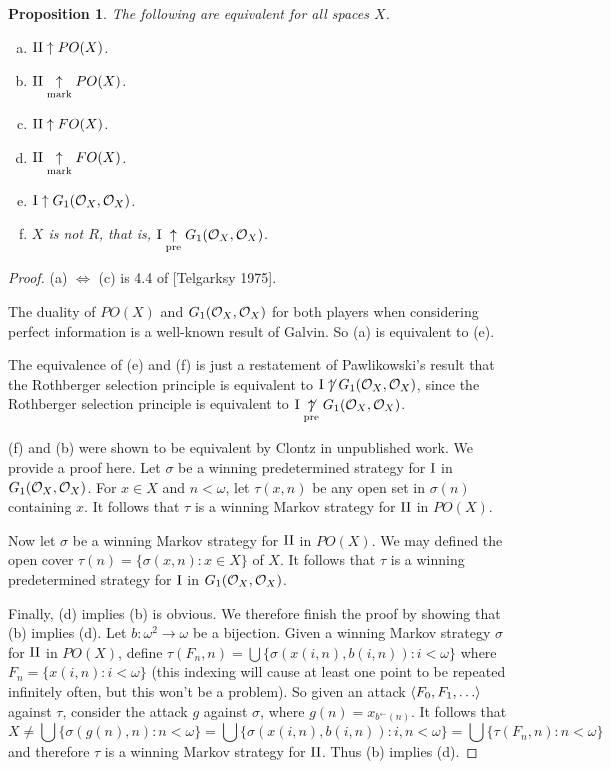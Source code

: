 \documentclass{amsart}
\theoremstyle{plain}
\newtheorem{proposition}[theorem]{Proposition}
\theoremstyle{definition}
\theoremstyle{remark}
\theoremstyle{plain}
\theoremstyle{definition}
\theoremstyle{remark}
\begin{document}
\begin{proposition}
 The following are equivalent for all spaces \(X\).
 \begin{enumerate}[a)]
  \item \(\mathrm{II}\uparrow PO(X)\).
  \item \(\mathrm{II}\underset{\text{mark}}{\uparrow} PO(X)\).
  \item \(\mathrm{II}\uparrow FO(X)\).
  \item \(\mathrm{II}\underset{\text{mark}}{\uparrow} FO(X)\).
  \item \(\mathrm{I}\uparrow G_1(\mathcal{O}_{X},\mathcal{O}_{X})\).
  \item \(X\) is not \(R\), that is, \(\mathrm{I}\underset{\text{pre}}{\uparrow} G_1(\mathcal{O}_{X},\mathcal{O}_{X})\).
 \end{enumerate}
\end{proposition}
\begin{proof}
 (a) \(\Leftrightarrow\) (c) is 4.4 of [Telgarksy 1975].

 The duality of \(PO(X)\) and \(G_1(\mathcal{O}_{X},\mathcal{O}_{X})\) for both players when considering perfect information is a well-known result of Galvin. 
 So (a) is equivalent to (e).

 The equivalence of (e) and (f) is just a restatement of Pawlikowski's result that the Rothberger selection principle is equivalent to \(\mathrm{I}\not\uparrow G_1(\mathcal{O}_{X},\mathcal{O}_{X})\), since the Rothberger selection principle is equivalent to \(\mathrm{I}\underset{\text{pre}}{\not\uparrow}G_1(\mathcal{O}_{X},\mathcal{O}_{X})\).

 (f) and (b) were shown to be equivalent by Clontz in unpublished work.
 We provide a proof here.
 Let \(\sigma\) be a winning predetermined strategy for \(\mathrm{I}\) in \(G_1(\mathcal{O}_{X},\mathcal{O}_{X})\).
 For \(x\in X\) and \(n<\omega\), let \(\tau(x,n)\) be any open set in \(\sigma(n)\) containing \(x\). 
 It follows that \(\tau\) is a winning Markov strategy for \(\mathrm{II}\) in \(PO(X)\).

 Now let \(\sigma\) be a winning Markov strategy for \(\mathrm{II}\) in \(PO(X)\).
 We may defined the open cover \(\tau(n)=\{\sigma(x,n):x\in X\}\) of \(X\).
 It follows that \(\tau\) is a winning predetermined strategy for \(\mathrm{I}\) in \(G_1(\mathcal{O}_{X},\mathcal{O}_{X})\).

 Finally, (d) implies (b) is obvious.
 We therefore finish the proof by showing that (b) implies (d).
 Let \(b:\omega^2\to\omega\) be a bijection.
 Given a winning Markov strategy \(\sigma\) for \(\mathrm{II}\) in \(PO(X)\), define \(\tau(F_n,n)=\bigcup\{\sigma(x(i,n),b(i,n)):i<\omega\}\) where \(F_n=\{x(i,n):i<\omega\}\) (this indexing will cause at least one point to be repeated infinitely often, but this won't be a problem). 
 So given an attack \(\<F_0,F_1,\dots\>\) against \(\tau\), consider the attack \(g\) against \(\sigma\), where \(g(n)=x_{b^{\leftarrow}(n)}\). 
 It follows that
 \[
   X \not= \bigcup\{\sigma(g(n),n):n<\omega\} = \bigcup\{\sigma(x(i,n),b(i,n)):i,n<\omega\} = \bigcup\{\tau(F_n,n):n<\omega\}
 \]
 and therefore \(\tau\) is a winning Markov strategy for \(\mathrm{II}\).
 Thus (b) implies (d).
\end{proof}
\end{document}
